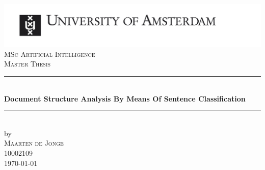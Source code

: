 \begin{titlepage}

\newcommand{\HRule}{\rule{\linewidth}{0.5mm}} %
\center %
 

\includegraphics[width=\linewidth]{figures/uvaeng}\\[2.5cm]
\textsc{\Large MSc Artificial Intelligence}\\[0.2cm]
\textsc{\Large Master Thesis}\\[0.5cm] 


\HRule \\[0.4cm]
{ \huge \bfseries Document Structure Analysis By Means Of Sentence Classification}\\[0.4cm] %
\HRule \\[0.5cm]
 

by\\[0.2cm]
\textsc{\Large{Maarten de Jonge}}\\[0.2cm] %
10002109 \\[1cm]



{\Large \today}\\[1cm] %


\end{titlepage}
